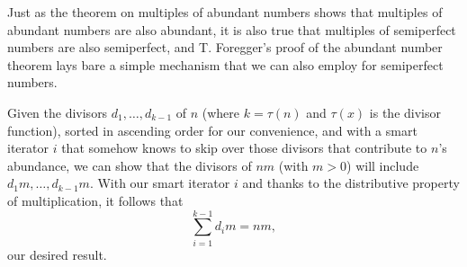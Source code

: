 \documentclass[12pt]{article}
\begin{document}
Just as the theorem on multiples of abundant numbers shows that multiples of abundant numbers are also abundant, it is also true that multiples of semiperfect numbers are also semiperfect, and T. Foregger's proof of the abundant number theorem lays bare a simple mechanism that we can also employ for semiperfect numbers.

Given the divisors $d_1, \ldots, d_{k - 1}$ of $n$ (where $k = \tau(n)$ and $\tau(x)$ is the divisor function), sorted in ascending order for our convenience, and with a smart iterator $i$ that somehow knows to skip over those divisors that contribute to $n$'s abundance, we can show that the divisors of $nm$ (with $m > 0$) will include $d_1m, \ldots, d_{k - 1}m$. With our smart iterator $i$ and thanks to the distributive property of multiplication, it follows that $$\sum_{i = 1}^{k - 1} d_im = nm,$$ our desired result.
\end{document}
